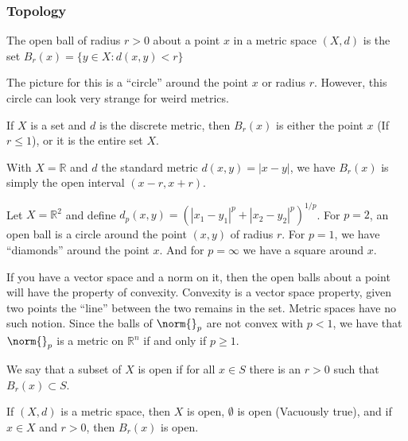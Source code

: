 \documentclass[crop=false,class=article,oneside]{standalone}
\begin{document}
    \subsubsection{Topology}
        \begin{definition}
            The open ball of radius $r>0$
            about a point $x$ in a metric space
            $(X,d)$ is the set
            $B_{r}(x)=\{y\in{X}:d(x,y)<r\}$
        \end{definition}
        The picture for this is a ``circle'' around the
        point $x$ or radius $r$. However, this circle
        can look very strange for weird metrics.
        \begin{example}
            If $X$ is a set and $d$ is the discrete metric,
            then $B_{r}(x)$ is either the point $x$
            (If $r\leq{1}$), or it is the entire set $X$.
        \end{example}
        \begin{example}
            With $X=\mathbb{R}$ and $d$ the standard metric
            $d(x,y)=|x-y|$, we have $B_{r}(x)$ is simply
            the open interval $(x-r,x+r)$.
        \end{example}
        \begin{example}
            Let $X=\mathbb{R}^{2}$ and define
            $d_{p}(x,y)%
             =(|x_{1}-y_{1}|^{p}+|x_{2}-y_{2}|^{p})^{1/p}$.
            For $p=2$, an open ball is a circle around
            the point $(x,y)$ of radius $r$. For $p=1$,
            we have ``diamonds'' around the point $x$.
            And for $p=\infty$ we have a square
            around $x$.
        \end{example}
        If you have a vector space and a norm on it,
        then the open balls about a point will have the
        property of convexity. Convexity is a vector space
        property, given two points the ``line'' between the
        two remains in the set. Metric spaces have no such
        notion. Since the balls of $\norm{}_{p}$ are not
        convex with $p<1$, we have that $\norm{}_{p}$ is
        a metric on $\mathbb{R}^{n}$
        if and only if $p\geq{1}$.
        \begin{definition}
            We say that a subset of $X$ is open if
            for all $x\in{S}$ there is an $r>0$
            such that $B_{r}(x)\subset{S}$.
        \end{definition}
        \begin{example}
            If $(X,d)$ is a metric space, then
            $X$ is open, $\emptyset$ is open
            (Vacuously true), and if $x\in{X}$ and
            $r>0$, then $B_{r}(x)$ is open.
        \end{example}
\end{document}
